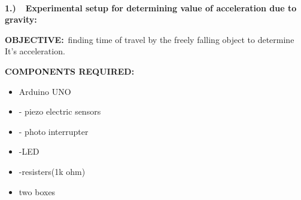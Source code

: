 \documentclass[12pt]{article}
\begin{document}
{\fontsize{17.28pt}{19.2pt}\selectfont \textbf{\tab \  }\par}


\newpage
\par


\vspace{\baselineskip}
\tab \tab \tab \tab {}\par


\vspace{\baselineskip}
{\fontsize{14pt}{16.8pt}\selectfont \textbf{1.)\ \  Experimental setup for determining value of acceleration due to gravity:}\par}\par


\vspace{\baselineskip}
{\fontsize{14pt}{16.8pt}\selectfont \textbf{OBJECTIVE:}\  finding time of travel by the freely falling object to determine It’s acceleration.\par}\par


\vspace{\baselineskip}
{\fontsize{14pt}{16.8pt}\selectfont \textbf{COMPONENTS REQUIRED:}\par}\par

\begin{itemize}
	\item {\fontsize{14pt}{16.8pt}\selectfont Arduino UNO\par}\par

	\item {\fontsize{14pt}{16.8pt} - piezo electric sensors\par}\par

	\item {\fontsize{14pt}{16.8pt} - photo interrupter\par}\par

	\item {\fontsize{14pt}{16.8pt}-LED\par}\par

	\item {\fontsize{14pt}{16.8pt}-resisters(1k ohm)\par}\par

	\item {\fontsize{14pt}{16.8pt}\selectfont two boxes\par}
\end{itemize}\par
\end{document}
